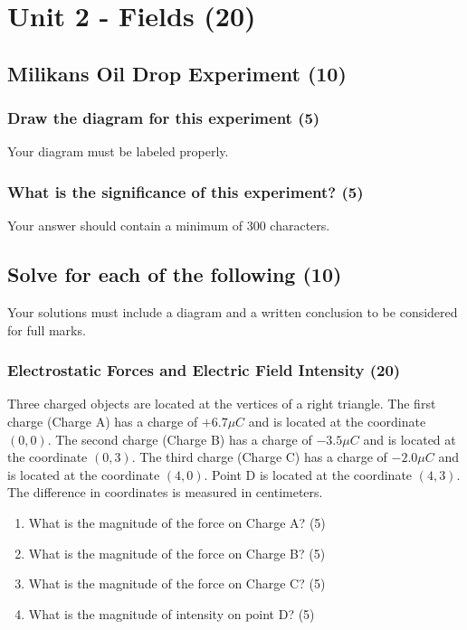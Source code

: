\documentclass{article}
\begin{document}
\section{Unit 2 - Fields (20)}
\subsection{Milikans Oil Drop Experiment (10)}
\subsubsection{Draw the diagram for this experiment (5)}
Your diagram must be labeled properly.

\subsubsection{What is the significance of this experiment? (5)}
Your answer should contain a minimum of 300 characters.

\subsection{Solve for each of the following (10)}
Your solutions must include a diagram and a written conclusion to be considered for full marks.

\subsubsection{Electrostatic Forces and Electric Field Intensity (20)}
Three charged objects are located at the vertices of a right triangle. The first charge (Charge A) has a charge of $+6.7\mu C$ and is located at the coordinate $(0, 0)$. The second charge (Charge B) has a charge of $-3.5\mu C$ and is located at the coordinate $(0, 3)$. The third charge (Charge C) has a charge of $-2.0\mu C$ and is located at the coordinate $(4, 0)$. Point D is located at the coordinate $(4, 3)$. The difference in coordinates is measured in centimeters.
\begin{enumerate}[label=\alph*)]
    \item What is the magnitude of the force on Charge A? (5)
    \item What is the magnitude of the force on Charge B? (5)
    \item What is the magnitude of the force on Charge C? (5)
    \item What is the magnitude of intensity on point D? (5)
\end{enumerate}
\end{document}

